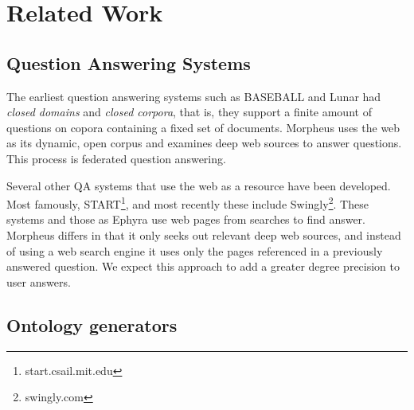 \section{Related Work}
\label{sec:relatedwork}

\subsection{Question Answering Systems} 

The earliest question answering systems such as BASEBALL \cite{Green1961} and Lunar \cite{woods1973} had \emph{closed domains} and \emph{closed corpora}, that is, they support a finite amount of questions on copora containing a fixed set of documents. Morpheus uses the web as its dynamic, open corpus and examines deep web sources to answer questions.  This process is federated question answering.


Several other QA systems that use the web as a resource have been developed. Most famously, START\footnote{start.csail.mit.edu}, and most recently these include Swingly\footnote{swingly.com}.  These systems and those as Ephyra \cite{Schlaefer06apattern} use web pages from searches to find answer.  Morpheus differs in that it only seeks out relevant deep web sources, and instead of using a web search engine it uses only the pages referenced in a previously answered question.  We expect this approach to add a greater degree precision to user answers.

\subsection{Ontology generators} 
\label{sec:ontology_generators}



